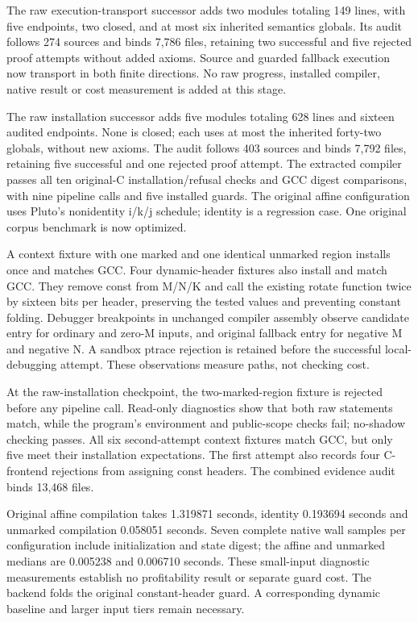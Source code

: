 The raw execution-transport successor adds two modules totaling 149 lines,
with five endpoints, two closed, and at most six inherited semantics globals.
Its audit follows 274 sources and binds 7,786 files, retaining two successful
and five rejected proof attempts without added axioms. Source and guarded
fallback execution now transport in both finite directions. No raw progress,
installed compiler, native result or cost measurement is added at this stage.

The raw installation successor adds five modules totaling 628 lines and
sixteen audited endpoints. None is closed; each uses at most the inherited
forty-two globals, without new axioms. The audit follows 403 sources and binds
7,792 files, retaining five successful and one rejected proof attempt. The
extracted compiler passes all ten original-C installation/refusal checks and
GCC digest comparisons, with nine pipeline calls and five installed guards.
The original affine configuration uses Pluto's nonidentity i/k/j schedule;
identity is a regression case. One original corpus benchmark is now optimized.

A context fixture with one marked and one identical unmarked region installs
once and matches GCC. Four dynamic-header fixtures also install and match
GCC. They remove const from M/N/K and call the existing rotate function twice
by sixteen bits per header, preserving the tested values and preventing
constant folding. Debugger breakpoints in unchanged compiler assembly observe
candidate entry for ordinary and zero-M inputs, and original fallback entry
for negative M and negative N. A sandbox ptrace rejection is retained before
the successful local-debugging attempt. These observations measure paths,
not checking cost.

At the raw-installation checkpoint, the two-marked-region fixture is rejected before any pipeline call.
Read-only diagnostics show that both raw statements match, while the program's
environment and public-scope checks fail; no-shadow checking passes. All six
second-attempt context fixtures match GCC, but only five meet their installation
expectations. The first attempt also records four C-frontend rejections from
assigning const headers. The combined evidence audit binds 13,468 files.

Original affine compilation takes 1.319871 seconds, identity 0.193694 seconds
and unmarked compilation 0.058051 seconds. Seven complete native wall samples
per configuration include initialization and state digest; the affine and
unmarked medians are 0.005238 and 0.006710 seconds. These small-input diagnostic
measurements establish no profitability result or separate guard cost. The
backend folds the original constant-header guard. A corresponding dynamic
baseline and larger input tiers remain necessary.

